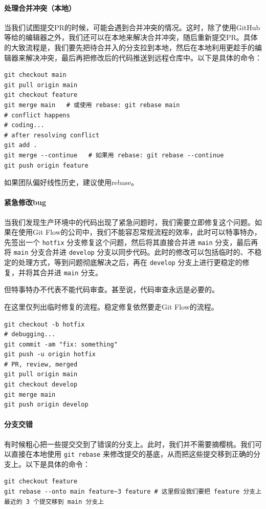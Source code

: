 \paragraph{处理合并冲突（本地）} 当我们试图提交PR的时候，可能会遇到合并冲突的情况。这时，除了使用GitHub等给的编辑器之外，我们还可以在本地来解决合并冲突，随后重新提交PR。具体的大致流程是，我们要先把待合并入的分支拉到本地，然后在本地利用更趁手的编辑器来解决冲突，最后再把修改后的代码推送到远程仓库中。以下是具体的命令：
\begin{verbatim}
git checkout main
git pull origin main 
git checkout feature
git merge main   # 或使用 rebase: git rebase main
# conflict happens
# coding...
# after resolving conflict
git add .
git merge --continue   # 如果用 rebase: git rebase --continue
git push origin feature
\end{verbatim}

如果团队偏好线性历史，建议使用rebase。

\paragraph{紧急修改bug} 当我们发现生产环境中的代码出现了紧急问题时，我们需要立即修复这个问题。如果在使用Git Flow的公司中，我们不能容忍常规流程的效率，此时可以特事特办，先签出一个 \verb|hotfix| 分支修复这个问题，然后将其直接合并进 \verb|main| 分支，最后再将 \verb|main| 分支合并进 \verb|develop| 分支以同步代码。此时的修改可以包括临时的、不稳定的处理方式，等到问题彻底解决之后，再在 \verb|develop| 分支上进行更稳定的修复，并将其合并进 \verb|main| 分支。

但特事特办不代表不能代码审查。甚至说，代码审查永远是必要的。

在这里仅列出临时修复的流程。稳定修复依然要走Git Flow的流程。
\begin{verbatim}
git checkout -b hotfix
# debugging...
git commit -am "fix: something"
git push -u origin hotfix
# PR, review, merged
git pull origin main
git checkout develop
git merge main
git push origin develop
\end{verbatim}

\paragraph{分支交错} 有时候粗心把一些提交交到了错误的分支上。此时，我们并不需要摘樱桃。我们可以直接在本地使用 \verb|git rebase| 来修改提交的基底，从而把这些提交移到正确的分支上。以下是具体的命令：
\begin{verbatim}
git checkout feature
git rebase --onto main feature~3 feature # 这里假设我们要把 feature 分支上最近的 3 个提交移到 main 分支上
\end{verbatim}

